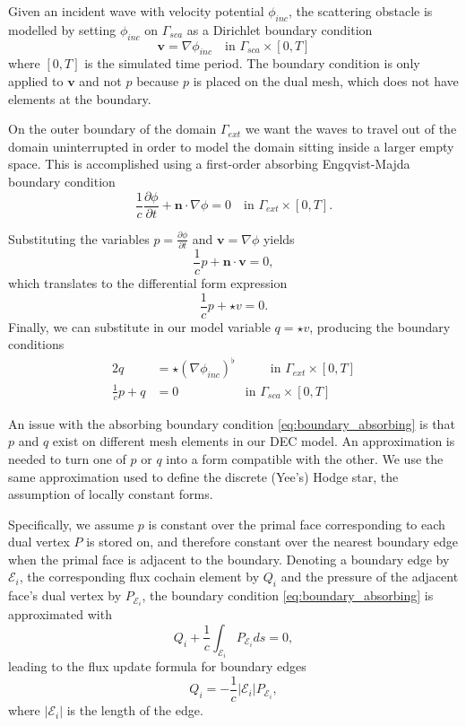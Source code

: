 \documentclass[utf8,english]{gradu3}
\begin{document}
Given an incident wave with velocity potential $\phi_{inc}$,
the scattering obstacle is modelled by setting $\phi_{inc}$ on $\Gamma_{sca}$
as a Dirichlet boundary condition
\begin{equation}
  \mathbf{v} = \nabla \phi_{inc}
  \quad \text{in } \Gamma_{sca} \times [0, T]
\end{equation}
where $[0,T]$ is the simulated time period.
The boundary condition is only applied to $\mathbf{v}$
and not $p$ because $p$ is placed on the dual mesh,
which does not have elements at the boundary.

On the outer boundary of the domain $\Gamma_{ext}$
we want the waves to travel out of the domain uninterrupted
in order to model the domain sitting inside a larger empty space.
This is accomplished using a first-order absorbing Engqvist-Majda boundary condition
\parencite{engquist_absorbing_1977}
\[
  \frac{1}{c}\frac{\partial\phi}{\partial t} + \mathbf{n} \cdot \nabla\phi = 0
  \quad \text{in } \Gamma_{ext} \times [0, T].
\]

Substituting the variables $p = \frac{\partial \phi}{\partial t}$
and $\mathbf{v} = \nabla \phi$ yields
\[
  \frac{1}{c}p + \mathbf{n} \cdot \mathbf{v} = 0,
\]
which translates to the differential form expression
\[
  \frac{1}{c}p + \star v = 0.
\]
Finally, we can substitute in our model variable $q = \star v$,
producing the boundary conditions
\begin{alignat}{2}
  \label{eq:boundary_dirichlet}
  q &= \star(\nabla \phi_{inc})^{\flat} & \qquad \text{in } \Gamma_{ext} \times [0, T] \\
  \label{eq:boundary_absorbing}
  \frac{1}{c} p + q &= 0 & \text{in } \Gamma_{sca} \times [0, T]
\end{alignat}

An issue with the absorbing boundary condition \eqref{eq:boundary_absorbing}
is that $p$ and $q$ exist on different mesh elements in our DEC model.
An approximation is needed to turn one of $p$ or $q$ into a form compatible with the other.
We use the same approximation used to define the discrete (Yee's) Hodge star,
the assumption of locally constant forms.

Specifically, we assume $p$ is constant over the primal face corresponding
to each dual vertex $P$ is stored on,
and therefore constant over the nearest boundary edge
when the primal face is adjacent to the boundary.
Denoting a boundary edge by $\mathcal{E}_i$,
the corresponding flux cochain element by $Q_i$
and the pressure of the adjacent face's dual vertex by $P_{\mathcal{E}_i}$,
the boundary condition \eqref{eq:boundary_absorbing} is approximated with
\[
  Q_i + \frac{1}{c} \int_{\mathcal{E}_i} P_{\mathcal{E}_i} ds = 0,
\]
leading to the flux update formula for boundary edges
\begin{equation}
  Q_i = -\frac{1}{c} |\mathcal{E}_i| P_{\mathcal{E}_i},
\end{equation}
where $|\mathcal{E}_i|$ is the length of the edge.
\end{document}
